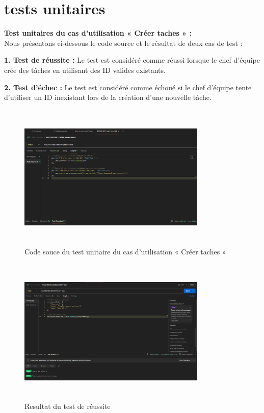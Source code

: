 \newpage
\section{tests unitaires}
\textbf{Test unitaires du cas d’utilisation « Créer taches  » :}\\
\bigskip
Nous présentons ci-dessous le code source et le résultat de deux cas de test :
\bigskip


\textbf{1. Test de réussite :} Le test est considéré comme réussi lorsque le chef d'équipe crée des tâches en utilisant des ID valides existants.

\textbf{2. Test d'échec :} Le test est considéré comme échoué si le chef d'équipe tente d'utiliser un ID inexistant lors de la création d'une nouvelle tâche.

\bigskip

\begin{figure}[h!]
  \centering
  \includegraphics[width=0.8\textwidth, height=7cm]{chap4.images/source test.png}
  \caption{ Code souce du test unitaire du cas d’utilisation « Créer taches » }

\end{figure}


\begin{figure}[h!]
  \centering
  \includegraphics[width=0.8\textwidth, height=7cm]{chap4.images/reussite.png}
  \caption{ Resultat du test de réussite}

\end{figure}

